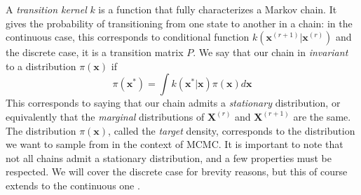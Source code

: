 \documentclass[12pt]{memoir}
\newcommand{\mb}{\mathbf}
\newcommand{\ti}{\textit}
\begin{document}
A \ti{transition kernel} $k$ is a function that fully characterizes a Markov chain. It gives the probability of transitioning from one state to another in a chain: in the continuous case, this corresponds to conditional function $k(\mb x^{(r+1)}| \mb x^{(r)})$ and the discrete case, it is a transition matrix $P$. We say that our chain in \ti{invariant} to a distribution $\pi(\mb x)$ if 
\begin{equation}
    \pi(\mb x^*) = \int k(\mb x^*|\mb x) \pi(\mb x)d\mb x
\end{equation}
This corresponds to saying that our chain admits a \ti{stationary} distribution, or equivalently that the \ti{marginal} distributions of $\mb X^{(r)}$ and $\mb X^{(r+1)}$ are the same. The distribution $\pi(\mb x)$, called the \ti{target} density, corresponds to the distribution we want to sample from in the context of MCMC. It is important to note that not all chains admit a stationary distribution, and a few properties must be respected. We will cover the discrete case for brevity reasons, but this of course extends to the continuous one \cite{mcmc:slides:Rigon2024Mar,wiki:markov-chain}.
\end{document}
